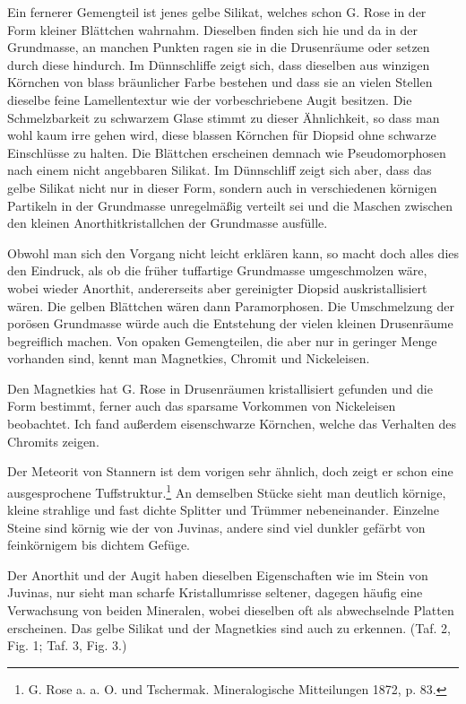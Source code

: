 \documentclass[a4paper, 12pt, oneside]{article}
\begin{document}
Ein fernerer Gemengteil ist jenes gelbe Silikat, welches schon G. Rose in der Form kleiner Blättchen wahrnahm. Dieselben finden sich hie und da in der Grundmasse, an manchen Punkten ragen sie in die Drusenräume oder setzen durch diese hindurch. Im Dünnschliffe zeigt sich, dass dieselben aus winzigen Körnchen von blass bräunlicher Farbe bestehen und dass sie an vielen Stellen dieselbe feine Lamellentextur wie der vorbeschriebene Augit besitzen. Die Schmelzbarkeit zu schwarzem Glase stimmt zu dieser Ähnlichkeit, so dass man wohl kaum irre gehen wird, diese blassen Körnchen für Diopsid ohne schwarze Einschlüsse zu halten. Die Blättchen erscheinen demnach wie Pseudomorphosen nach einem nicht angebbaren Silikat. Im Dünnschliff zeigt sich aber, dass das gelbe Silikat nicht nur in dieser Form, sondern auch in verschiedenen körnigen Partikeln in der Grundmasse unregelmäßig verteilt sei und die Maschen zwischen den kleinen Anorthitkristallchen der Grundmasse ausfülle.

Obwohl man sich den Vorgang nicht leicht erklären kann, so macht doch alles dies den Eindruck, als ob die früher tuffartige Grundmasse umgeschmolzen wäre, wobei wieder Anorthit, andererseits aber gereinigter Diopsid auskristallisiert wären. Die gelben Blättchen wären dann Paramorphosen. Die Umschmelzung der porösen Grundmasse würde auch die Entstehung der vielen kleinen Drusenräume begreiflich machen. Von opaken Gemengteilen, die aber nur in geringer Menge vorhanden sind, kennt man Magnetkies, Chromit und Nickeleisen.

Den Magnetkies hat G. Rose in Drusenräumen kristallisiert gefunden und die Form bestimmt, ferner auch das sparsame Vorkommen von Nickeleisen beobachtet. Ich fand außerdem eisenschwarze Körnchen, welche das Verhalten des Chromits zeigen.

Der Meteorit von Stannern ist dem vorigen sehr ähnlich, doch zeigt er schon eine ausgesprochene Tuffstruktur.\footnote{G. Rose a. a. O. und Tschermak. Mineralogische Mitteilungen 1872, p. 83.} An demselben Stücke sieht man deutlich körnige, kleine strahlige und fast dichte Splitter und Trümmer nebeneinander. Einzelne Steine sind körnig wie der von Juvinas, andere sind viel dunkler gefärbt von feinkörnigem bis dichtem Gefüge.

Der Anorthit und der Augit haben dieselben Eigenschaften wie im Stein von Juvinas, nur sieht man scharfe Kristallumrisse seltener, dagegen häufig eine Verwachsung von beiden Mineralen, wobei dieselben oft als abwechselnde Platten erscheinen. Das gelbe Silikat und der Magnetkies sind auch zu erkennen. (Taf. 2, Fig. 1; Taf. 3, Fig. 3.)
\end{document}

